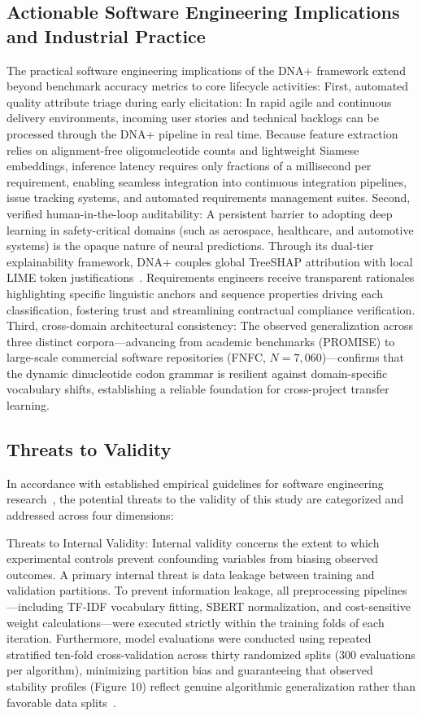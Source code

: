\subsection{Actionable Software Engineering Implications and Industrial Practice}
The practical software engineering implications of the DNA+ framework extend beyond benchmark accuracy metrics to core lifecycle activities:
First, automated quality attribute triage during early elicitation: In rapid agile and continuous delivery environments, incoming user stories and technical backlogs can be processed through the DNA+ pipeline in real time. Because feature extraction relies on alignment-free oligonucleotide counts and lightweight Siamese embeddings, inference latency requires only fractions of a millisecond per requirement, enabling seamless integration into continuous integration pipelines, issue tracking systems, and automated requirements management suites.
Second, verified human-in-the-loop auditability: A persistent barrier to adopting deep learning in safety-critical domains (such as aerospace, healthcare, and automotive systems) is the opaque nature of neural predictions. Through its dual-tier explainability framework, DNA+ couples global TreeSHAP attribution with local LIME token justifications~\cite{ref21,ref22}. Requirements engineers receive transparent rationales highlighting specific linguistic anchors and sequence properties driving each classification, fostering trust and streamlining contractual compliance verification.
Third, cross-domain architectural consistency: The observed generalization across three distinct corpora—advancing from academic benchmarks (PROMISE) to large-scale commercial software repositories (FNFC, $N=7,060$)—confirms that the dynamic dinucleotide codon grammar is resilient against domain-specific vocabulary shifts, establishing a reliable foundation for cross-project transfer learning.

\subsection{Threats to Validity}
In accordance with established empirical guidelines for software engineering research~\cite{ref23,ref24,ref25}, the potential threats to the validity of this study are categorized and addressed across four dimensions:

Threats to Internal Validity: Internal validity concerns the extent to which experimental controls prevent confounding variables from biasing observed outcomes. A primary internal threat is data leakage between training and validation partitions. To prevent information leakage, all preprocessing pipelines—including TF-IDF vocabulary fitting, SBERT normalization, and cost-sensitive weight calculations—were executed strictly within the training folds of each iteration. Furthermore, model evaluations were conducted using repeated stratified ten-fold cross-validation across thirty randomized splits (300 evaluations per algorithm), minimizing partition bias and guaranteeing that observed stability profiles (Figure 10) reflect genuine algorithmic generalization rather than favorable data splits~\cite{ref12,ref13,ref14,ref15}.

